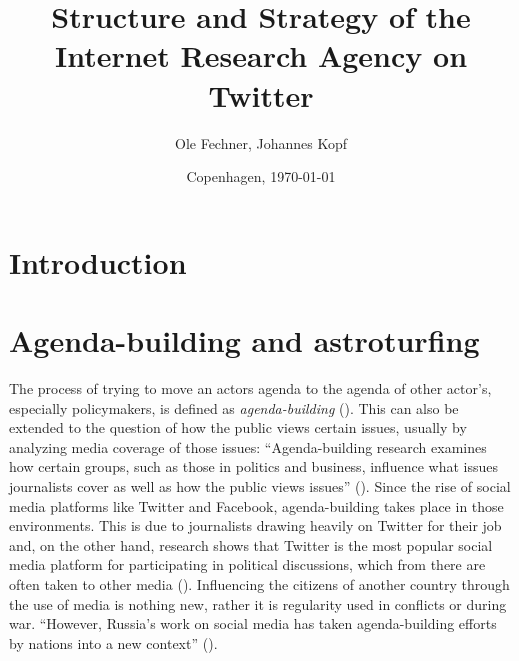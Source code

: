 \documentclass[12pt, titlepage=true, toc=bib]{scrartcl}
\begin{document}
\titlehead{}
\author{Ole Fechner, Johannes Kopf}
\title{Structure and Strategy of the Internet Research Agency on Twitter}


\date{\normalsize{Copenhagen, \today}}

\publishers{}

\maketitle[0]

\newpage

\thispagestyle{empty}
\tableofcontents

\newpage
\setcounter{page}{1}

\section{Introduction}

\section{Agenda-building and astroturfing}

The process of trying to move an actors agenda to the agenda of other actor's, especially policymakers, is defined as \textit{agenda-building} (\cite[3]{linvill_troll_2018}). This can also be extended to the question of how the public views certain issues, usually by analyzing media coverage of those issues: ``Agenda-building research examines how certain groups, such as those in politics and business, influence what issues journalists cover as well as how the public views issues'' (\cite[434]{parmelee_agenda-building_2014}). Since the rise of social media platforms like Twitter and Facebook, agenda-building takes place in those environments. This is due to journalists drawing heavily on Twitter for their job and, on the other hand, research shows that Twitter is the most popular social media platform for participating in political discussions, which from there are often taken to other media (\cite[435, 437]{parmelee_agenda-building_2014}). Influencing the citizens of another country through the use of media is nothing new, rather it is regularity used in conflicts or during war. ``However, Russia's work on social media has taken agenda-building efforts by nations into a new context'' (\cite[3]{linvill_troll_2018}).
\end{document}
